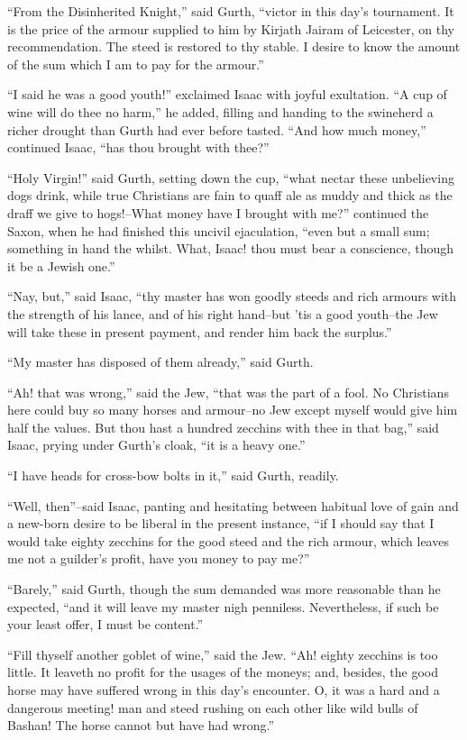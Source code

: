 ``From the Disinherited Knight,'' said Gurth, ``victor in this day's
tournament. It is the price of the armour supplied to him by Kirjath
Jairam of Leicester, on thy recommendation. The steed is restored to thy
stable. I desire to know the amount of the sum which I am to pay for the
armour.''

``I said he was a good youth!'' exclaimed Isaac with joyful exultation.
``A cup of wine will do thee no harm,'' he added, filling and handing to
the swineherd a richer drought than Gurth had ever before tasted. ``And
how much money,'' continued Isaac, ``has thou brought with thee?''

``Holy Virgin!'' said Gurth, setting down the cup, ``what nectar these
unbelieving dogs drink, while true Christians are fain to quaff ale as
muddy and thick as the draff we give to hogs!--What money have I brought
with me?'' continued the Saxon, when he had finished this uncivil
ejaculation, ``even but a small sum; something in hand the whilst. What,
Isaac! thou must bear a conscience, though it be a Jewish one.''

``Nay, but,'' said Isaac, ``thy master has won goodly steeds and rich
armours with the strength of his lance, and of his right hand--but 'tis
a good youth--the Jew will take these in present payment, and render him
back the surplus.''

``My master has disposed of them already,'' said Gurth.

``Ah! that was wrong,'' said the Jew, ``that was the part of a fool. No
Christians here could buy so many horses and armour--no Jew except
myself would give him half the values. But thou hast a hundred zecchins
with thee in that bag,'' said Isaac, prying under Gurth's cloak, ``it is
a heavy one.''

``I have heads for cross-bow bolts in it,'' said Gurth, readily.

``Well, then''--said Isaac, panting and hesitating between habitual love
of gain and a new-born desire to be liberal in the present instance,
``if I should say that I would take eighty zecchins for the good steed
and the rich armour, which leaves me not a guilder's profit, have you
money to pay me?''

``Barely,'' said Gurth, though the sum demanded was more reasonable than
he expected, ``and it will leave my master nigh penniless. Nevertheless,
if such be your least offer, I must be content.''

``Fill thyself another goblet of wine,'' said the Jew. ``Ah! eighty
zecchins is too little. It leaveth no profit for the usages of the
moneys; and, besides, the good horse may have suffered wrong in this
day's encounter. O, it was a hard and a dangerous meeting! man and steed
rushing on each other like wild bulls of Bashan! The horse cannot but
have had wrong.''

